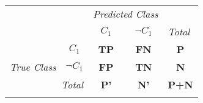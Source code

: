 \begin{center}
	\begin{tabular}{lp{1cm}p{1cm}p{1cm}p{1cm}}
		                                                           &                                                                & \multicolumn{2}{c}{\textit{Predicted Class}}              & \multicolumn{1}{l}{}                                                                                \\ \cline{3-4}
		                                                           & \multicolumn{1}{l|}{}                                          & \multicolumn{1}{c|}{\cellcolor{faugray!62}\textbf{$C_1$}} & \multicolumn{1}{c|}{\cellcolor{faugray!62}\textbf{$\neg C_1$}} & \multicolumn{1}{l}{\textit{Total}} \\ \cline{2-5}
		\multicolumn{1}{c|}{}                                      & \multicolumn{1}{c|}{\cellcolor{faugray!62}\textbf{$C_1$}}      & \multicolumn{1}{c|}{\textbf{TP}}                          & \multicolumn{1}{c|}{\textbf{FN}}                               & \multicolumn{1}{c}{\textbf{P}}     \\ \cline{2-4}
		\multicolumn{1}{c|}{\multirow{-2}{*}{\textit{True Class}}} & \multicolumn{1}{c|}{\cellcolor{faugray!62}\textbf{$\neg C_1$}} & \multicolumn{1}{c|}{\textbf{FP}}                          & \multicolumn{1}{c|}{\textbf{TN}}                               & \multicolumn{1}{c}{\textbf{N}}     \\ \cline{2-5}
		\multicolumn{2}{r|}{\textit{Total}}                        & \multicolumn{1}{c}{\textbf{P'}}                                & \multicolumn{1}{c|}{\textbf{N'}}                          & \multicolumn{1}{c}{\textbf{P+N}}                                                                    \\
		                                                           &                                                                &                                                           &                                                                &
	\end{tabular}
\end{center}

\vspace*{-0.25cm}
